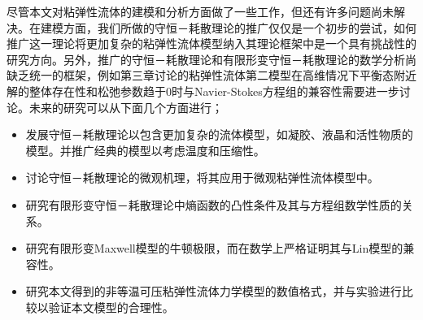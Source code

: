 尽管本文对粘弹性流体的建模和分析方面做了一些工作，但还有许多问题尚未解决。在建模方面，我们所做的守恒－耗散理论的推广仅仅是一个初步的尝试，如何推广这一理论将更加复杂的粘弹性流体模型纳入其理论框架中是一个具有挑战性的研究方向。另外，推广的守恒－耗散理论和有限形变守恒－耗散理论的数学分析尚缺乏统一的框架，例如第三章讨论的粘弹性流体第二模型在高维情况下平衡态附近解的整体存在性和松弛参数趋于$0$时与Navier-Stokes方程组的兼容性需要进一步讨论。未来的研究可以从下面几个方面进行；
\begin{itemize}
	\item 发展守恒－耗散理论以包含更加复杂的流体模型，如凝胶、液晶和活性物质的模型。并推广经典的模型以考虑温度和压缩性。
	\item 讨论守恒－耗散理论的微观机理，将其应用于微观粘弹性流体模型中。
	\item 研究有限形变守恒－耗散理论中熵函数的凸性条件及其与方程组数学性质的关系。
	\item 研究有限形变Maxwell模型的牛顿极限，而在数学上严格证明其与Lin模型的兼容性。	
	\item 研究本文得到的非等温可压粘弹性流体力学模型的数值格式，并与实验进行比较以验证本文模型的合理性。
\end{itemize}

% 
